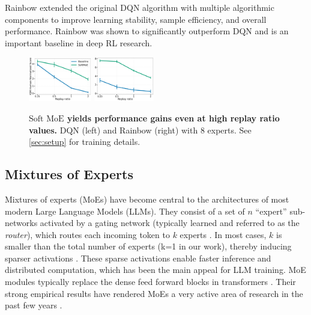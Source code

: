\documentclass{article}
\theoremstyle{plain}
\theoremstyle{definition}
\theoremstyle{remark}
\newcommand{\softmoe}{$\textrm{Soft MoE}$}
\begin{document}
Rainbow \citep{Hessel2018RainbowCI} extended the original DQN algorithm with multiple algorithmic components to improve learning stability, sample efficiency, and overall performance. Rainbow was shown to significantly outperform DQN and is an important baseline in deep RL research.

\ifarxiv
\else
    \begin{figure}[!t]
        \centering
        \includegraphics[width=0.245\textwidth]{figures/MOEs_replayratio_dqn_experts8CORR_COLOR2.pdf}%
        \includegraphics[width=0.235\textwidth]{figures/MOEs_replayratio_rainbow_experts8CORR_COLOR2.pdf}%
        \vspace{-0.4cm}
        \caption{\textbf{\softmoe{} yields performance gains even at high replay ratio values.} DQN (left) and Rainbow (right) with 8 experts. See \cref{sec:setup} for training details.}
        \label{fig:replayRatioPlots}
        \vspace{-0.2cm}
    \end{figure}
\fi

\subsection{Mixtures of Experts}
\label{sec:moeBackground}
Mixtures of experts (MoEs) have become central to the architectures of most modern Large Language Models (LLMs). They consist of a set of $n$ ``expert'' sub-networks activated by a gating network (typically learned and referred to as the {\em router}), which routes each incoming token to $k$ experts \citep{shazeer2017outrageously}. In most cases, $k$ is smaller than the total number of experts (k=1 in our work), thereby inducing sparser activations \citep{fedus2022switch}. These sparse activations enable faster inference and distributed computation, which has been the main appeal for LLM training. MoE modules typically replace the dense feed forward blocks in transformers \citep{vaswani2017attention}. Their strong empirical results have rendered MoEs a very active area of research in the past few years \citep{shazeer2017outrageously,Lewis2021BASELS,fedus2022switch,zhou2022mixture,puigcerver2023sparse,lepikhin2020gshard,zoph2022stmoe,gale2023megablocks}.
\end{document}
